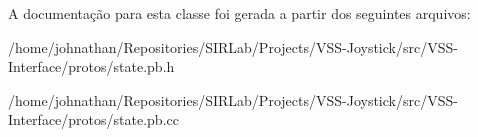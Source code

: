 A documentação para esta classe foi gerada a partir dos seguintes arquivos\+:\begin{DoxyCompactItemize}
\item 
/home/johnathan/\+Repositories/\+S\+I\+R\+Lab/\+Projects/\+V\+S\+S-\/\+Joystick/src/\+V\+S\+S-\/\+Interface/protos/state.\+pb.\+h\item 
/home/johnathan/\+Repositories/\+S\+I\+R\+Lab/\+Projects/\+V\+S\+S-\/\+Joystick/src/\+V\+S\+S-\/\+Interface/protos/state.\+pb.\+cc\end{DoxyCompactItemize}
